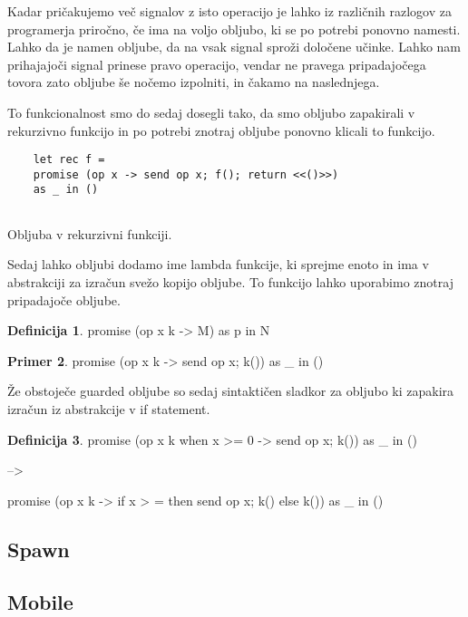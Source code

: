 \documentclass[12pt,a4paper,twoside]{article}
\theoremstyle{definition} %
\newtheorem{definicija}{Definicija}[section]
\newtheorem{primer}[definicija]{Primer}
\theoremstyle{plain} %
\numberwithin{equation}{section}  %
\begin{document}
Kadar pričakujemo več signalov z isto operacijo je lahko iz različnih razlogov za programerja priročno, če ima na voljo obljubo, ki se po potrebi ponovno namesti. Lahko da je namen obljube, da na vsak signal sproži določene učinke. Lahko nam prihajajoči signal prinese pravo operacijo, vendar ne pravega pripadajočega tovora zato obljube še nočemo izpolniti, in čakamo na naslednjega.

To funkcionalnost smo do sedaj dosegli tako, da smo obljubo zapakirali v rekurzivno funkcijo in po potrebi znotraj obljube ponovno klicali to funkcijo.


\begin{listing}[h]
	\begin{verbatim}
	let rec f =
	promise (op x -> send op x; f(); return <<()>>) 
	as _ in ()
	
	\end{verbatim}
	\caption{Obljuba v rekurzivni funkciji.}
\end{listing}


Sedaj lahko obljubi dodamo ime lambda funkcije, ki sprejme enoto in ima v abstrakciji za izračun svežo kopijo obljube. To funkcijo lahko uporabimo znotraj pripadajoče obljube.

\begin{definicija}
	promise (op x k -> M) as p in N
\end{definicija}

\begin{primer}
	promise (op x k -> send op x; k())
	as \_ in ()
\end{primer}

Že obstoječe guarded obljube so sedaj sintaktičen sladkor za obljubo ki zapakira izračun iz abstrakcije v if statement.
\begin{definicija}

	promise (op x k when x >= 0 -> send op x; k())
	as \_ in ()
	
	-->
	
	promise (op x k -> if x > = then send op x; k() else k())
	as \_ in ()
\end{definicija}


\subsection{Spawn}

\subsection{Mobile}
\end{document}
